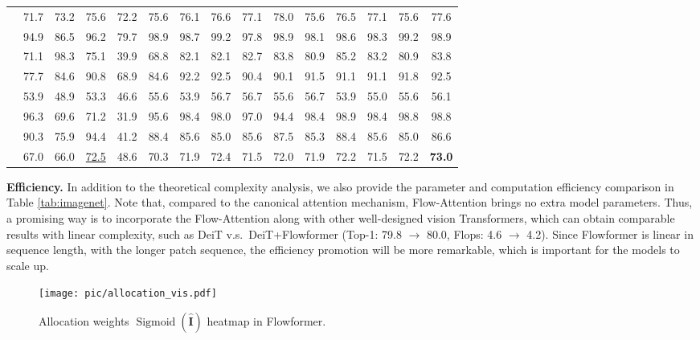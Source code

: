 \documentclass[nohyperref]{article}
\theoremstyle{plain}
\theoremstyle{definition}
\theoremstyle{remark}
\begin{document}
\begin{table*}[tb]
\begin{small}
\begin{sc}
\begin{tabular}{l|cccccccccccccc}
				\scalebox{0.8}{Heartbeat} & 71.7  & 73.2& 75.6 & 72.2 & 75.6 & 76.1 & 76.6& 77.1 & 78.0 & 75.6 & 76.5 & 77.1 & 75.6 & 77.6 \\
				\scalebox{0.8}{JapaneseVowels} & 94.9  & 86.5 & 96.2& 79.7 & 98.9 & 98.7 &99.2& 97.8 &  98.9 & 98.1 & 98.6 & 98.3 & 99.2 & 98.9\\
				\scalebox{0.8}{PEMS-SF} & 71.1  & 98.3& 75.1 & 39.9 & 68.8 & 82.1 &82.1 & 82.7 & 83.8 & 80.9 &  85.2 & 83.2 & 80.9 &  83.8\\
				\scalebox{0.9}{SelfRegulationSCP1} & 77.7  & 84.6& 90.8 & 68.9 & 84.6 & 92.2 &92.5 & 90.4 & 90.1 & 91.5 & 91.1 & 91.1 & 91.8 & 92.5\\
			    \scalebox{0.8}{SelfRegulationSCP2} & 53.9 & 48.9& 53.3  & 46.6 & 55.6 &53.9 & 56.7 & 56.7 & 55.6 & 56.7 & 53.9 & 55.0 & 55.6 & 56.1\\
			    \scalebox{0.8}{SpokenArabicDigits} & 96.3  & 69.6& 71.2 & 31.9 & 95.6 & 98.4 &98.0 & 97.0 & 94.4 & 98.4 & 98.9 & 98.4 & 98.8& 98.8\\
			    \scalebox{0.8}{UWaveGestureLibrary} & 90.3 & 75.9& 94.4 & 41.2 & 88.4 & 85.6 &85.0 & 85.6 & 87.5 & 85.3 &  88.4 & 85.6 & 85.0 & 86.6\\
			    \midrule
			    \scalebox{0.95}{Average Accuracy} & 67.0 & 66.0  & \underline{72.5} &48.6 & 70.3 & 71.9 & 72.4 & 71.5 & 72.0 & 71.9 &  72.2 & 71.5 &72.2 & \textbf{73.0} \\
				\bottomrule
			\end{tabular}
		\end{sc}
	\end{small}
\end{table*}

\textbf{Efficiency.} In addition to the theoretical complexity analysis, we also provide the parameter and computation efficiency comparison in Table \ref{tab:imagenet}. Note that, compared to the canonical attention mechanism, Flow-Attention brings no extra model parameters. Thus, a promising way is to incorporate the Flow-Attention along with other well-designed vision Transformers, which can obtain comparable results with linear complexity, such as DeiT v.s.~DeiT+Flowformer (Top-1: 79.8 $\to$ 80.0, Flops: 4.6 $\to$ 4.2). Since Flowformer is linear in sequence length, with the longer patch sequence, the efficiency promotion will be more remarkable, which is important for the models to scale up.

\begin{figure}[h]
    \begin{center}
    \centerline{\texttt{[image: pic/allocation\_vis.pdf]}}
    \vspace{-5pt}
    \caption{Allocation weights $\operatorname{Sigmoid}(\widehat{\mathbf{I}})$ heatmap in Flowformer.}
    \label{fig:allocation_vis}
    \end{center}
    \vspace{-10pt}
\end{figure}
\end{document}
